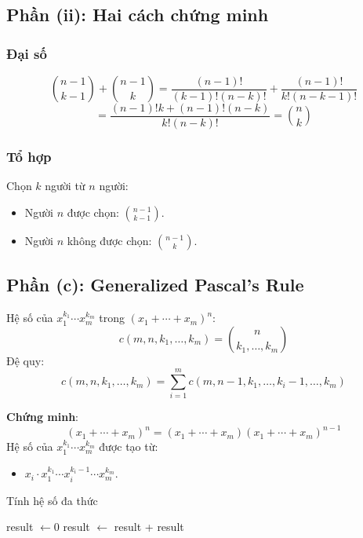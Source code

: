 \documentclass[a4paper,12pt]{article}
\theoremstyle{plain}
\theoremstyle{definition}
\begin{document}
\subsection*{Phần (ii): Hai cách chứng minh}

\subsubsection*{Đại số}
\[
\binom{n-1}{k-1} + \binom{n-1}{k} = \frac{(n-1)!}{(k-1)!(n-k)!} + \frac{(n-1)!}{k!(n-k-1)!}
\]
\[
= \frac{(n-1)!k + (n-1)!(n-k)}{k!(n-k)!} = \binom{n}{k}
\]

\subsubsection*{Tổ hợp}
Chọn \( k \) người từ \( n \) người:
\begin{itemize}
    \item Người \( n \) được chọn: \( \binom{n-1}{k-1} \).
    \item Người \( n \) không được chọn: \( \binom{n-1}{k} \).
\end{itemize}

\subsection*{Phần (c): Generalized Pascal's Rule}

Hệ số của \( x_1^{k_1}\cdots x_m^{k_m} \) trong \( (x_1 + \cdots + x_m)^n \):
\[
c(m,n,k_1,\ldots,k_m) = \binom{n}{k_1,\ldots,k_m}
\]
Đệ quy:
\[
c(m,n,k_1,\ldots,k_m) = \sum_{i=1}^m c(m,n-1,k_1,\ldots,k_i-1,\ldots,k_m)
\]

\textbf{Chứng minh}:
\[
(x_1 + \cdots + x_m)^n = (x_1 + \cdots + x_m)(x_1 + \cdots + x_m)^{n-1}
\]
Hệ số của \( x_1^{k_1}\cdots x_m^{k_m} \) được tạo từ:
\begin{itemize}
    \item \( x_i \cdot x_1^{k_1}\cdots x_i^{k_i-1}\cdots x_m^{k_m} \).
\end{itemize}

\begin{algorithm}
\caption{Tính hệ số đa thức}
\begin{algorithmic}
     
     
    \EndIf
    \State result $\gets 0$
        \State result $\gets$ result + 
    \EndFor
    \State \Return result
\EndFunction
\end{algorithmic}
\end{algorithm}
\end{document}
